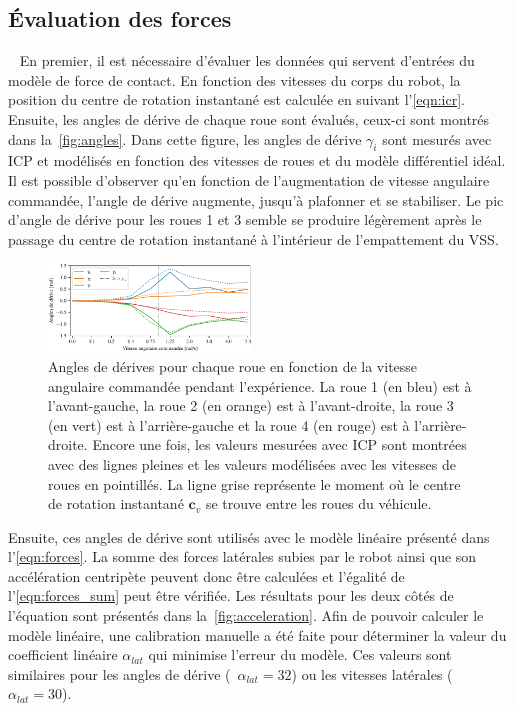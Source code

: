 \subsection{Évaluation des forces}~\label{sec:forces}
En premier, il est nécessaire d'évaluer les données qui servent d'entrées du modèle de force de contact. 
En fonction des vitesses du corps du robot, la position du centre de rotation instantané est calculée en suivant l'\autoref{eqn:icr}.
Ensuite, les angles de dérive de chaque roue sont évalués, ceux-ci sont montrés dans la~\autoref{fig:angles}.
Dans cette figure, les angles de dérive $\gamma_i$ sont mesurés avec \ac{ICP} et modélisés en fonction des vitesses de roues et du modèle différentiel idéal.
Il est possible d'observer qu'en fonction de l'augmentation de vitesse angulaire commandée, l'angle de dérive augmente, jusqu'à plafonner et se stabiliser. 
Le pic d'angle de dérive pour les roues 1 et 3 semble se produire légèrement après le passage du centre de rotation instantané à l'intérieur de l'empattement du \ac{VSS}.

\begin{figure}[htpb]
	\centering
	\includegraphics[width=0.48\textwidth]{figs/slip_angles.pdf}
	\caption{Angles de dérives pour chaque roue en fonction de la vitesse angulaire commandée pendant l'expérience.
			La roue 1 (en bleu) est à l'avant-gauche, la roue 2 (en orange) est à l'avant-droite, la roue 3 (en vert) est à l'arrière-gauche et la roue 4 (en rouge) est à l'arrière-droite.
			Encore une fois, les valeurs mesurées avec \ac{ICP} sont montrées avec des lignes pleines et les valeurs modélisées avec les vitesses de roues en pointillés.
			La ligne grise représente le moment où le centre de rotation instantané $\bm c_v$ se trouve entre les roues du véhicule.}
	\label{fig:angles}
\end{figure}

Ensuite, ces angles de dérive sont utilisés avec le modèle linéaire présenté dans l'\autoref{eqn:forces}.
La somme des forces latérales subies par le robot ainsi que son accélération centripète peuvent donc être calculées et l'égalité de l'\autoref{eqn:forces_sum} peut être vérifiée.
Les résultats pour les deux côtés de l'équation sont présentés dans la~\autoref{fig:acceleration}.
Afin de pouvoir calculer le modèle linéaire, une calibration manuelle a été faite pour déterminer la valeur du coefficient linéaire $\alpha_{lat}$ qui minimise l'erreur du modèle.
Ces valeurs sont similaires pour les angles de dérive (\ie~$\alpha_{lat} = 32$) ou les vitesses latérales (\ie~$\alpha_{lat} = 30$).

